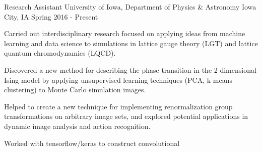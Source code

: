 \vspace{-1.75ex}


\begin{cventries}
  \cventry
  {Research Assistant} %
  {University of Iowa, Department of Physics \& Astronomy} %
  {Iowa City, IA} %
  {Spring 2016 - Present} %
  {
      \begin{cvitems} %
          \item {Carried out interdisciplinary research focused on applying
                  ideas from machine learning and data science to simulations in
                  lattice gauge theory (LGT) and lattice quantum chromodynamics 
                  (LQCD).}
          \item {Discovered a new method for describing the phase transition in
                  the 2-dimensional Ising model by applying unsupervised
                  learning techniques (PCA, k-means clustering) to Monte Carlo
                  simulation images.}
          \item {Helped to create a new technique for implementing
                  renormalization group transformations on arbitrary image
                  sets, and explored potential applications in dynamic image
                  analysis and action recognition.}
          \item {Worked with tensorflow/keras to construct convolutional
}
\end{cvitems}}
\end{cventries}
